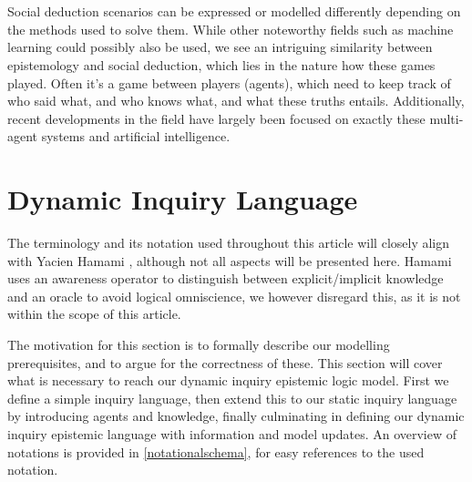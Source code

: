 \\\\

Social deduction scenarios can be expressed or modelled differently depending
on the methods used to solve them. While other noteworthy fields such as
machine learning could possibly also be used, we see an intriguing similarity
between epistemology and social deduction, which lies in the nature how these
games played. Often it's a game between players (agents), which need to keep
track of who said what, and who knows what, and what these truths entails.
Additionally, recent developments in the field have largely been focused on
exactly these multi-agent systems and artificial intelligence.

\section{Dynamic Inquiry Language}
The terminology and its notation used throughout this article will closely
align with Yacien Hamami \cite{delimi}, although not all aspects will be
presented here. Hamami uses an awareness operator to distinguish between
explicit/implicit knowledge and an oracle to avoid logical omniscience, we
however disregard this, as it is not within the scope of this article.

The motivation for this section is to formally describe our modelling
prerequisites, and to argue for the correctness of these. This section will
cover what is necessary to reach our dynamic inquiry epistemic logic model.
First we define a simple inquiry language, then extend this to our static
inquiry language by introducing agents and knowledge, finally culminating in
defining our dynamic inquiry epistemic language with information and model
updates. An overview of notations is provided in \cref{notationalschema}, for
easy references to the used notation.

\newpage

